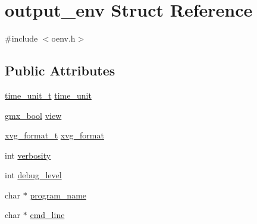 \hypertarget{structoutput__env}{\section{output\-\_\-env \-Struct \-Reference}
\label{structoutput__env}
}


{\ttfamily \#include $<$oenv.\-h$>$}

\subsection*{\-Public \-Attributes}
\begin{DoxyCompactItemize}
\item 
\hyperlink{include_2oenv_8h_a3d22ad5a38686169d43e6a4c4d428bfd}{time\-\_\-unit\-\_\-t} \hyperlink{structoutput__env_a6c461212851b05404c4d5d441ff1f715}{time\-\_\-unit}
\item 
\hyperlink{include_2types_2simple_8h_a8fddad319f226e856400d190198d5151}{gmx\-\_\-bool} \hyperlink{structoutput__env_adff8c672632586cb93e2a618a258a573}{view}
\item 
\hyperlink{include_2oenv_8h_a63667ace8f986d92d1a7841cc3b366ae}{xvg\-\_\-format\-\_\-t} \hyperlink{structoutput__env_a506afc2f61c4997373e67d54f849e90f}{xvg\-\_\-format}
\item 
int \hyperlink{structoutput__env_a08cfed7a1244aaacf0b2434943d3f27d}{verbosity}
\item 
int \hyperlink{structoutput__env_a6a0a49765e2892452a05ca2098c193f0}{debug\-\_\-level}
\item 
char $\ast$ \hyperlink{structoutput__env_a6e7acbd718949102d123546c5567890e}{program\-\_\-name}
\item 
char $\ast$ \hyperlink{structoutput__env_a436631c570a1a5ccf8ccd4f600af452e}{cmd\-\_\-line}
\end{DoxyCompactItemize}


